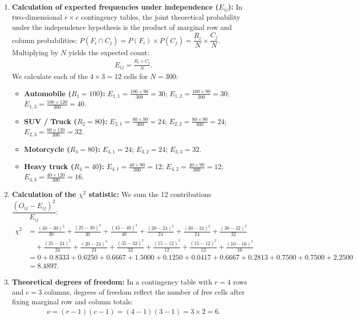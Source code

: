 \begin{solproblema}
	\begin{enumerate}
		\item \textbf{Calculation of expected frequencies under independence ($E_{ij}$):}
		In two-dimensional $r \times c$ contingency tables, the joint theoretical probability under the independence hypothesis is the product of marginal row and column probabilities: $P(F_i \cap C_j) = P(F_i) \times P(C_j) = \dfrac{R_i}{N} \times \dfrac{C_j}{N}$. Multiplying by $N$ yields the expected count:
		\begin{align}
			E_{ij} = \frac{R_i \times C_j}{N}.
		\end{align}
		We calculate each of the $4 \times 3 = 12$ cells for $N = 300$:
		\begin{itemize}
			\item \textbf{Automobile ($R_1 = 100$):} $E_{1,1} = \frac{100 \times 90}{300} = 30$; $E_{1,2} = \frac{100 \times 90}{300} = 30$; $E_{1,3} = \frac{100 \times 120}{300} = 40$.
			\item \textbf{SUV / Truck ($R_2 = 80$):} $E_{2,1} = \frac{80 \times 90}{300} = 24$; $E_{2,2} = \frac{80 \times 90}{300} = 24$; $E_{2,3} = \frac{80 \times 120}{300} = 32$.
			\item \textbf{Motorcycle ($R_3 = 80$):} $E_{3,1} = 24$; $E_{3,2} = 24$; $E_{3,3} = 32$.
			\item \textbf{Heavy truck ($R_4 = 40$):} $E_{4,1} = \frac{40 \times 90}{300} = 12$; $E_{4,2} = \frac{40 \times 90}{300} = 12$; $E_{4,3} = \frac{40 \times 120}{300} = 16$.
		\end{itemize}
		
		\item \textbf{Calculation of the $\chi^2$ statistic:}
		We sum the 12 contributions $\dfrac{(O_{ij} - E_{ij})^2}{E_{ij}}$:
		\begin{align}
			\chi^2 &= \frac{(30-30)^2}{30} + \frac{(25-30)^2}{30} + \frac{(45-40)^2}{40} + \frac{(20-24)^2}{24} + \frac{(30-24)^2}{24} + \frac{(30-32)^2}{32} \\
			&\quad + \frac{(25-24)^2}{24} + \frac{(20-24)^2}{24} + \frac{(35-32)^2}{32} + \frac{(15-12)^2}{12} + \frac{(15-12)^2}{12} + \frac{(10-16)^2}{16} \\
			&= 0 + 0.8333 + 0.6250 + 0.6667 + 1.5000 + 0.1250 + 0.0417 + 0.6667 + 0.2813 + 0.7500 + 0.7500 + 2.2500 \\
			&= 8.4897.
		\end{align}
		
		\item \textbf{Theoretical degrees of freedom:}
		In a contingency table with $r = 4$ rows and $c = 3$ columns, degrees of freedom reflect the number of free cells after fixing marginal row and column totals:
		\begin{align}
			\nu = (r - 1)(c - 1) = (4 - 1)(3 - 1) = 3 \times 2 = 6.
		\end{align}
		

\end{enumerate}
\end{solproblema}
